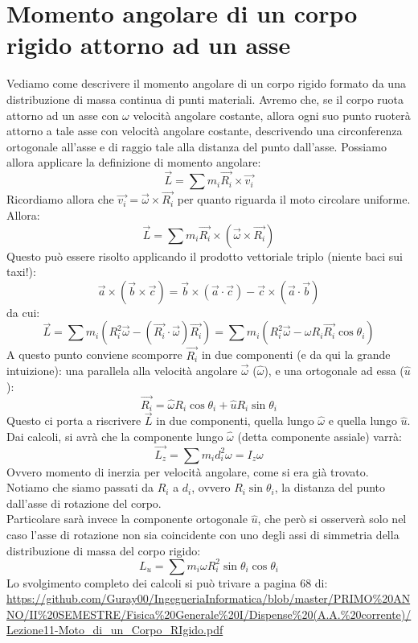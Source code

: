 \documentclass[a4paper,12pt]{article}
\begin{document}
\section{Momento angolare di un corpo rigido attorno ad un asse}
Vediamo come descrivere il momento angolare di un corpo rigido formato da una distribuzione di massa continua di punti materiali.
Avremo che, se il corpo ruota attorno ad un asse con $\omega$ velocità angolare costante, allora ogni suo punto ruoterà
attorno a tale asse con velocità angolare costante, descrivendo una circonferenza ortogonale all'asse e di raggio tale alla 
distanza del punto dall'asse. Possiamo allora applicare la definizione di momento angolare:
$$ \vec{L} = \sum m_i\vec{R_i} \times \vec{v_i} $$
Ricordiamo allora che $\vec{v_i} = \vec{\omega} \times \vec{R_i}$ per quanto riguarda il moto circolare uniforme. Allora:
$$ \vec{L}=\sum m_i\vec{R_i} \times (\vec{\omega} \times \vec{R_i})$$
Questo può essere risolto applicando il prodotto vettoriale triplo (niente baci sui taxi!):
$$ \vec{a} \times (\vec{b} \times \vec{c}) = \vec{b} \times (\vec{a} \cdot \vec{c}) - \vec{c} \times (\vec{a} \cdot \vec{b}) $$
da cui:
$$ \vec{L} = \sum m_i (R_i^2 \vec{\omega} - (\vec{R_i}\cdot\vec{\omega})\vec{R_i}) = \sum m_i (R_i^2 \vec{\omega} - \omega R_i \vec{R_i} \cos{\theta_i}) $$
A questo punto conviene scomporre $\vec{R_i}$ in due componenti (e da qui la grande intuizione): una parallela alla velocità angolare $\vec{\omega}$ ($\hat{\omega}$), e una ortogonale
ad essa ($\hat{u}$):
$$ \vec{R_i} = \hat{\omega}R_i\cos{\theta_i} + \hat{u}R_i\sin{\theta_i} $$
Questo ci porta a riscrivere $\vec{L}$ in due componenti, quella lungo $\hat{\omega}$ e quella lungo $\hat{u}$. Dai calcoli, si avrà che la componente lungo $\hat{\omega}$
(detta componente assiale) varrà:
$$ \vec{L_z} = \sum m_i d_i^2 \omega= I_z\omega $$
Ovvero momento di inerzia per velocità angolare, come si era già trovato. Notiamo che siamo passati da $R_i$ a $d_i$, ovvero $R_i\sin{\theta_i}$, la distanza del punto dall'asse di rotazione del corpo.
\\Particolare sarà invece la componente ortogonale $\hat{u}$, che però si osserverà
solo nel caso l'asse di rotazione non sia coincidente con uno degli assi di simmetria della distribuzione di massa del corpo rigido:
$$ L_u = \sum m_i\omega R_i^2 \sin{\theta_i}\cos{\theta_i} $$
Lo svolgimento completo dei calcoli si può trivare a pagina 68 di:
\url{https://github.com/Guray00/IngegneriaInformatica/blob/master/PRIMO%20ANNO/II%20SEMESTRE/Fisica%20Generale%20I/Dispense%20(A.A.%20corrente)/Lezione11-Moto_di_un_Corpo_RIgido.pdf}
\end{document}
